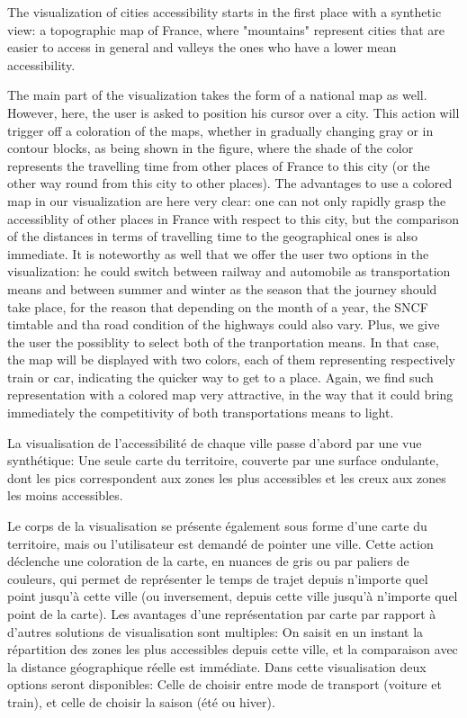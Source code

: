 \documentclass{vgtc}                          %
\begin{document}
The visualization of cities accessibility starts in the first place with a synthetic view: a topographic map of France, where "mountains" represent cities
that are easier to access in general and valleys the ones who have a lower mean accessibility.  
  
The main part of the visualization takes the form of a national map as well. However, here, the user is asked to position his cursor over a city.
This action will trigger off a coloration of the maps, whether in gradually changing gray or in contour blocks, as being shown in the figure, where
the shade of the color represents the travelling time from other places of France to this city (or the other way round from this city to other places).
The advantages to use a colored map in our visualization are here very clear: one can not only rapidly grasp the accessiblity of other places in France
with respect to this city, but the comparison of the distances in terms of travelling time to the geographical ones is also immediate.
It is noteworthy as well that we offer the user two options in the visualization: he could switch between railway and automobile as transportation means and between
summer and winter as the season that the journey should take place, for the reason that depending on the month of a year, the SNCF timtable and tha road condition of the highways could also vary.
Plus, we give the user the possiblity to select both of the tranportation means. In that case, the map will be displayed with two colors,
each of them representing respectively train or car, indicating the quicker way to get to a place. Again, we find such representation with a colored map very attractive, in the way that
it could bring immediately the competitivity of both transportations means to light.





\vspace{0.2cm}

La visualisation de l'accessibilité de chaque ville passe d'abord par une vue synthétique: Une seule carte du territoire, couverte par une surface ondulante, dont les pics correspondent aux zones les plus accessibles et les creux aux zones les moins accessibles. 

Le corps de la visualisation se présente également sous forme d'une carte du territoire, mais ou l'utilisateur est demandé de pointer une ville. Cette action déclenche une coloration de la carte, en nuances de gris ou par paliers de couleurs, qui permet de représenter le temps de trajet depuis n'importe quel point jusqu'à cette ville (ou inversement, depuis cette ville jusqu'à n'importe quel point de la carte). Les avantages d'une représentation par carte par rapport à d'autres solutions de visualisation sont multiples: On saisit en un instant la répartition des zones les plus accessibles depuis cette ville, et la comparaison avec la distance géographique réelle est immédiate. Dans cette visualisation deux options seront disponibles: Celle de choisir entre mode de transport (voiture et train), et celle de choisir la saison (été ou hiver). 
\end{document}
